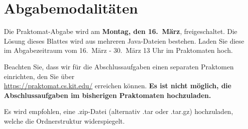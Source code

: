 \section*{Abgabemodalitäten}
Die Praktomat-Abgabe wird am \textbf{Montag, den 16.~März}, freigeschaltet. 
Die Lösung dieses Blattes wird aus mehreren Java-Dateien bestehen. 
Laden Sie diese im Abgabezeitraum vom 16.~März - 30.~März 13 Uhr
im Praktomaten hoch.

Beachten Sie, dass wir für die Abschlussaufgaben einen separaten Praktomen einrichten, den Sie über \\ \url{https://praktomat.cs.kit.edu/} erreichen können.
\textbf{Es ist nicht möglich, die Abschlussaufgaben im bisherigen Praktomaten hochzuladen.}

Es wird empfohlen, eine .zip-Datei (alternativ .tar oder .tar.gz) hochzuladen,
welche die Ordnerstruktur widerspiegelt.